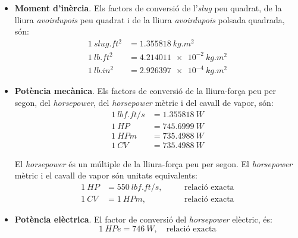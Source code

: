 \begin{itemize}
    \item \textbf{Moment d'inèrcia}. Els factors de conversió de l'\textit{slug} peu quadrat, de la lliura \textit{avoirdupois} peu quadrat   i de la lliura \textit{avoirdupois} polsada quadrada, són:
    \begin{subequations}
    \begin{align}
        \qty{1}{slug.ft^2} &= \qty{1,355818}{kg.m^2} \\
        \qty{1}{lb.ft^2} &= \qty{4,214011e-2}{kg.m^2} \\
        \qty{1}{lb.in^2} &= \qty{2,926397e-4}{kg.m^2}
    \end{align}
    \end{subequations}

    \item \textbf{Potència mecànica}. Els factors de conversió de la lliura-força peu per segon, del \textit{horsepower},  del \textit{horsepower} mètric i del cavall de vapor, són:
    \begin{subequations}
    \begin{align}
      \qty{1}{lbf.ft/s} &= \qty{1,355818}{W} \\
      \qty{1}{HP} &= \qty{745,6999}{W} \\
      \qty{1}{HPm} &= \qty{735,4988}{W} \\
      \qty{1}{CV} &= \qty{735,4988}{W}
    \end{align}
    \end{subequations}

    El \textit{horsepower} és un múltiple  de la lliura-força peu per segon. El \textit{horsepower} mètric i el cavall de vapor són unitats equivalents:
    \begin{subequations}
    \begin{alignat}{3}
      \qty{1}{HP} &= \qty{550}{lbf.ft/s},  &&\quad\text{relació exacta} \\
      \qty{1}{CV} &= \qty{1}{HPm}, &&\quad\text{relació exacta}
    \end{alignat}
    \end{subequations}


    \item \textbf{Potència elèctrica}. El factor de conversió del
    \textit{horsepower} elèctric, és:
    \begin{equation}
        \qty{1}{HPe} = \qty{746}{W},\quad\text{relació exacta}
    \end{equation}
  \end{itemize}


